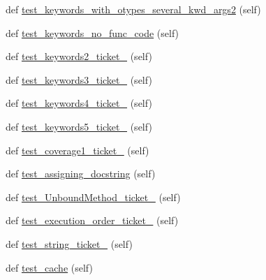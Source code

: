 \begin{DoxyCompactItemize}
\item 
def \hyperlink{classnumpy_1_1lib_1_1tests_1_1test__function__base_1_1TestVectorize_aa9cff4068a3cc610da28d70aef99323a}{test\+\_\+keywords\+\_\+with\+\_\+otypes\+\_\+several\+\_\+kwd\+\_\+args2} (self)
\item 
def \hyperlink{classnumpy_1_1lib_1_1tests_1_1test__function__base_1_1TestVectorize_a250a809cba8b9d7ebc057872dfb3b8ac}{test\+\_\+keywords\+\_\+no\+\_\+func\+\_\+code} (self)
\item 
def \hyperlink{classnumpy_1_1lib_1_1tests_1_1test__function__base_1_1TestVectorize_aa1ab71e4948a61d0b35f01c7a45c1250}{test\+\_\+keywords2\+\_\+ticket\+\_} (self)
\item 
def \hyperlink{classnumpy_1_1lib_1_1tests_1_1test__function__base_1_1TestVectorize_ac5b1179bf9660a81f0343b56a9941a8d}{test\+\_\+keywords3\+\_\+ticket\+\_} (self)
\item 
def \hyperlink{classnumpy_1_1lib_1_1tests_1_1test__function__base_1_1TestVectorize_a7f2f7df58342a6cc737b753f60f75f80}{test\+\_\+keywords4\+\_\+ticket\+\_} (self)
\item 
def \hyperlink{classnumpy_1_1lib_1_1tests_1_1test__function__base_1_1TestVectorize_a1c4a41e1db01a6984101291062acdfba}{test\+\_\+keywords5\+\_\+ticket\+\_} (self)
\item 
def \hyperlink{classnumpy_1_1lib_1_1tests_1_1test__function__base_1_1TestVectorize_a8050e0260a19b6df4ee9c809e1d6565e}{test\+\_\+coverage1\+\_\+ticket\+\_} (self)
\item 
def \hyperlink{classnumpy_1_1lib_1_1tests_1_1test__function__base_1_1TestVectorize_ad5ca4923a2cc05fdc5d73d5e9e21f175}{test\+\_\+assigning\+\_\+docstring} (self)
\item 
def \hyperlink{classnumpy_1_1lib_1_1tests_1_1test__function__base_1_1TestVectorize_acc89124939f251cfb470926aa9305e9d}{test\+\_\+\+Unbound\+Method\+\_\+ticket\+\_} (self)
\item 
def \hyperlink{classnumpy_1_1lib_1_1tests_1_1test__function__base_1_1TestVectorize_ab223b65e01af64c348272b0ccb743342}{test\+\_\+execution\+\_\+order\+\_\+ticket\+\_} (self)
\item 
def \hyperlink{classnumpy_1_1lib_1_1tests_1_1test__function__base_1_1TestVectorize_afa9778d3e54e4046c2a9846d70206543}{test\+\_\+string\+\_\+ticket\+\_} (self)
\item 
def \hyperlink{classnumpy_1_1lib_1_1tests_1_1test__function__base_1_1TestVectorize_a70594025e40ab62e80daad8da2a974e2}{test\+\_\+cache} (self)

\end{DoxyCompactItemize}

